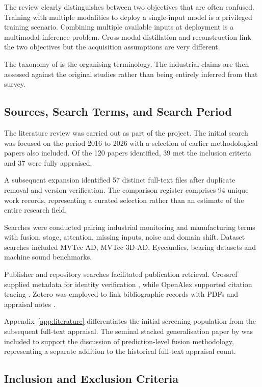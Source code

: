 The review clearly distinguishes between two objectives that are often confused. Training with
multiple modalities to deploy a single-input model is a privileged training scenario. Combining
multiple available inputs at deployment is a multimodal inference problem. Cross-modal distillation
and reconstruction link the two objectives but the acquisition assumptions are very different.

The taxonomy of \textcite{Baltrusaitis2019Multimodal} is the organising terminology. The industrial claims are then assessed against the original
studies rather than being entirely inferred from that survey.

\subsection{Sources, Search Terms, and Search Period}

The literature review was carried out as part of the project. The initial search was focused on the
period 2016 to 2026 with a selection of earlier methodological papers also included. Of the 120
papers identified, 39 met the inclusion criteria and 37 were fully appraised.

A subsequent expansion identified 57 distinct full-text files after duplicate removal and version
verification. The comparison register comprises 94 unique work records, representing a curated
selection rather than an estimate of the entire research field.

Searches were conducted pairing industrial monitoring and manufacturing terms with fusion, stage,
attention, missing inputs, noise and domain shift. Dataset searches included MVTec AD, MVTec 3D-AD,
Eyecandies, bearing datasets and machine sound benchmarks.

Publisher and repository searches facilitated publication retrieval. Crossref supplied metadata for
identity verification \parencite{Crossref2020REST}, while OpenAlex supported citation tracing
\parencite{Priem2022OpenAlex}. Zotero was employed to link bibliographic records with PDFs and appraisal
notes \parencite{Zotero2026}.

Appendix~\ref{app:literature} differentiates the initial screening population from the subsequent
full-text appraisal. The seminal stacked generalisation paper by \textcite{Ting1999Issues} was included
to support the discussion of prediction-level fusion methodology,
representing a separate addition to the historical full-text appraisal count.

\subsection{Inclusion and Exclusion Criteria}

